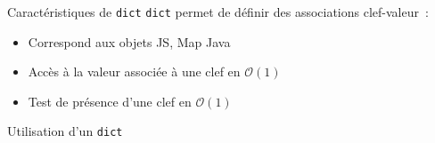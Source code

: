\begin{frame}{Caractéristiques de \texttt{dict}}
  \texttt{dict} permet de définir des associations clef-valeur~:
  \begin{itemize}[<+->]
    \item Correspond aux objets JS, Map Java
    \item Accès à la valeur associée à une clef en $\mathcal{O}(1)$
    \item Test de présence d'une clef en $\mathcal{O}(1)$
  \end{itemize}
\end{frame}

\begin{frame}{Utilisation d'un \texttt{dict}}
\end{frame}
